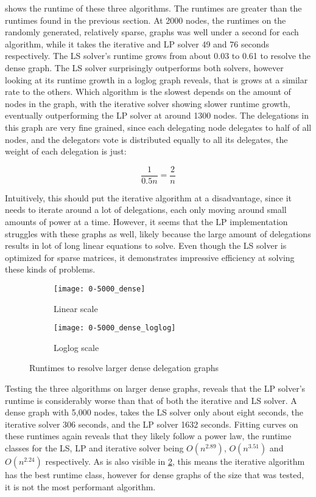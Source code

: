  shows the runtime of these three algorithms. The runtimes are greater than the runtimes found in the previous section. At 2000 nodes, the runtimes on the randomly generated, relatively sparse, graphs was well under a second for each algorithm, while it takes the iterative and LP solver 49 and 76 seconds respectively. The LS solver's runtime grows from about 0.03 to 0.61 to resolve the dense graph. The LS solver surprisingly outperforms both solvers, however looking at its runtime growth in a loglog graph reveals, that is grows at a similar rate to the others. Which algorithm is the slowest depends on the amount of nodes in the graph, with the iterative solver showing slower runtime growth, eventually outperforming the LP solver at around 1300 nodes. The delegations in this graph are very fine grained, since each delegating node delegates to half of all nodes, and the delegators vote is distributed equally to all its delegates, the weight of each delegation is just:

\[ 
\frac{1}{0.5n} = \frac{2}{n} 
\]

Intuitively, this should put the iterative algorithm at a disadvantage, since it needs to iterate around a lot of delegations, each only moving around small amounts of power at a time. However, it seems that the LP implementation struggles with these graphs as well, likely because the large amount of delegations results in lot of long linear equations to solve. Even though the LS solver is optimized for sparse matrices, it demonstrates impressive efficiency at solving these kinds of problems.

\begin{figure}[t]
    \centering
    \begin{subfigure}[t]{0.45\textwidth}
    	\centering
    	\texttt{[image: 0-5000\_dense]}
    	\caption{Linear scale}
    	\label{subfig:dense-large-linear}
    \end{subfigure}
    \hfill
    \begin{subfigure}[t]{0.45\textwidth}
        \centering
        \texttt{[image: 0-5000\_dense\_loglog]}
        \caption{Loglog scale}
         \label{subfig:dense-large-loglog}
    \end{subfigure}
    \caption{Runtimes to resolve larger dense delegation graphs}
    \label{fig:dense-large}
\end{figure}

Testing the three algorithms on larger dense graphs, reveals that the LP solver's runtime is considerably worse than that of both the iterative and LS solver. A dense graph with 5,000 nodes, takes the LS solver only about eight seconds, the iterative solver 306 seconds, and the LP solver 1632 seconds. Fitting curves on these runtimes again reveals that they likely follow a power law, the runtime classes for the LS, LP and iterative solver being $O(n^{2.89})$, $O(n^{3.51})$ and $O(n^{2.24})$ respectively. As is also visible in \cref{subfig:dense-large-loglog}, this means the iterative algorithm has the best runtime class, however for dense graphs of the size that was tested, it is not the most performant algorithm.

